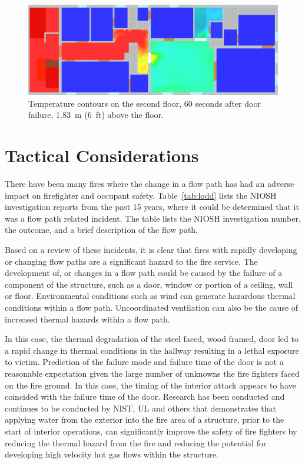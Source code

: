 \documentclass[11pt,oneside]{book}
\begin{document}
\begin{figure}[h!]
\centering
\includegraphics[width=.7\textwidth]{../Figures/west_50th_baseline_top_220_6ft}
 

\caption{Temperature contours on the second floor, 60 seconds after door failure, 1.83~m (6~ft) above the floor.}
\label{fig:temp_top_220}
\end{figure}


\section{Tactical Considerations}
There have been many fires where the change in a flow path has had an adverse impact on firefighter and occupant safety. Table~\ref{tab:lodd} lists the NIOSH investigation reports from the past 15 years, where it could be determined that it was a flow path related incident. The table lists the NIOSH investigation number, the outcome, and a brief description of the flow path. 

Based on a review of these incidents, it is clear that fires with rapidly developing or changing flow paths are a significant hazard to the fire service. The development of, or changes in a flow path could be caused by the failure of a component of the structure, such as a door, window or portion of a ceiling, wall or floor. Environmental conditions such as wind can generate hazardous thermal conditions within a flow path. Uncoordinated ventilation can also be the cause of increased thermal hazards within a flow path. 

In this case, the thermal degradation of the steel faced, wood framed, door led to a rapid change in thermal conditions in the hallway resulting in a lethal exposure to victim.  Prediction of the failure mode and failure time of the door is not a reasonable expectation given the large number of unknowns the fire fighters faced on the fire ground.  In this case, the timing of the interior attack appears to have coincided with the failure time of the door. Research has been conducted \cite{madrzykowski2009fire, kerber2009fire} and continues to be conducted by NIST, UL and others that demonstrates that applying water from the exterior into the fire area of a structure, prior to the start of interior operations, can significantly improve the safety of fire fighters by reducing the thermal hazard from the fire and reducing the potential for developing high velocity hot gas flows within the structure.
\end{document}
